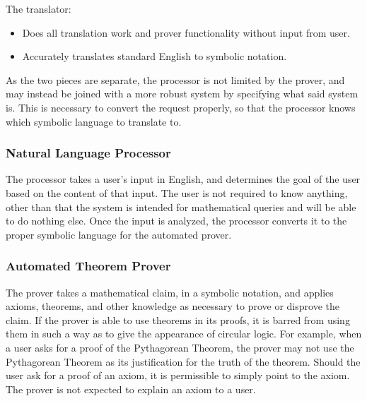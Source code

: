   The translator:                                                                     
  \begin{itemize}                                                                                          
	  \item{Does all translation work and prover functionality without input from user.}
  \item{Accurately translates standard English to symbolic notation.}                                      
  \end{itemize}

  As the two pieces are separate, the processor is not limited by the prover, and may instead be joined with a more robust system by specifying what said system is. This is necessary to convert the request properly, so that the processor knows which symbolic language to translate to.                                 
  \subsubsection{Natural Language Processor}                                                               
The processor takes a user's input in English, and determines the goal of the user based on the content of that input. The user is not required to know anything, other than that the system is intended for mathematical queries and will be able to do nothing else. Once the input is analyzed, the processor converts it to the proper symbolic language for the automated prover.                                         
  \subsubsection{Automated Theorem Prover}                                                                 
                                                                                                           
  The prover takes a mathematical claim, in a symbolic notation, and applies axioms, theorems, and other knowledge as necessary to prove or disprove the claim. If the prover is able to use theorems in its proofs, it is barred from using them in such a way as to give the appearance of circular logic. For example, when a user asks for a proof of the Pythagorean Theorem, the prover may not use the Pythagorean Theorem as its justification for the truth of the theorem. %
Should the user ask for a proof of an axiom, it is permissible to simply point to the axiom. The prover is not expected to explain an axiom to a user.   
